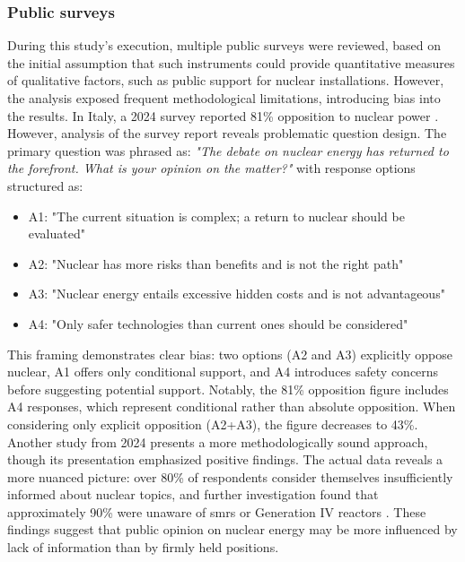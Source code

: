 \subsubsection{Public surveys}
During this study's execution, multiple public surveys were reviewed, based on the initial assumption that such instruments could provide quantitative measures of qualitative factors, such as public support for nuclear installations. However, the analysis exposed frequent methodological limitations, introducing bias into the results. In Italy, a 2024 survey reported 81\% opposition to nuclear power \cite{IPSOS_Nuclear_Survey_2024}. However, analysis of the survey report reveals problematic question design. The primary question was phrased as: \textit{"The debate on nuclear energy has returned to the forefront. What is your opinion on the matter?"} with response options structured as:
\begin{itemize}
    \item A1: "The current situation is complex; a return to nuclear should be evaluated"
    \item A2: "Nuclear has more risks than benefits and is not the right path"
    \item A3: "Nuclear energy entails excessive hidden costs and is not advantageous"
    \item A4: "Only safer technologies than current ones should be considered"
\end{itemize}

This framing demonstrates clear bias: two options (A2 and A3) explicitly oppose nuclear, A1 offers only conditional support, and A4 introduces safety concerns before suggesting potential support. Notably, the 81\% opposition figure includes A4 responses, which represent conditional rather than absolute opposition. When considering only explicit opposition (A2+A3), the figure decreases to 43\%.\\

Another study from 2024 presents a more methodologically sound approach, though its presentation emphasized positive findings. The actual data reveals a more nuanced picture: over 80\% of respondents consider themselves insufficiently informed about nuclear topics, and further investigation found that approximately 90\% were unaware of \glspl{smr} or Generation IV reactors \cite{SWG_Nuclear_Survey_2024}. These findings suggest that public opinion on nuclear energy may be more influenced by lack of information than by firmly held positions.

